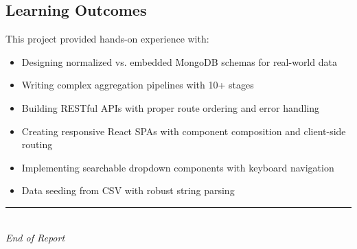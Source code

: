 \documentclass[12pt,a4paper]{article}
\begin{document}
\subsection{Learning Outcomes}
This project provided hands-on experience with:
\begin{itemize}[noitemsep]
    \item Designing normalized vs. embedded MongoDB schemas for real-world data
    \item Writing complex aggregation pipelines with 10+ stages
    \item Building RESTful APIs with proper route ordering and error handling
    \item Creating responsive React SPAs with component composition and client-side routing
    \item Implementing searchable dropdown components with keyboard navigation
    \item Data seeding from CSV with robust string parsing
\end{itemize}

\vspace{1cm}
\begin{center}
    \rule{0.5\textwidth}{0.4pt}\\[0.5cm]
    \textit{End of Report}
\end{center}
\end{document}
